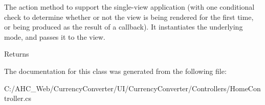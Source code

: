 The action method to support the single-\/view application (with one conditional check to determine whether or not the view is being rendered for the first time, or being produced as the result of a callback). It instantiates the underlying mode, and passes it to the view. 

\begin{DoxyReturn}{Returns}

\end{DoxyReturn}


The documentation for this class was generated from the following file\-:\begin{DoxyCompactItemize}
\item 
C\-:/\-A\-H\-C\-\_\-\-Web/\-Currency\-Converter/\-U\-I/\-Currency\-Converter/\-Controllers/Home\-Controller.\-cs\end{DoxyCompactItemize}
